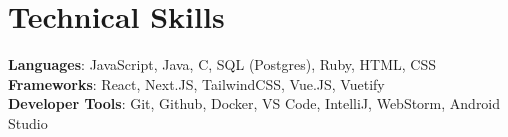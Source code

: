 \documentclass[letterpaper,11pt]{article}
\begin{document}
%
\section{Technical Skills}
 \begin{itemize}[leftmargin=0.15in, label={}]
    \small{\item{
     \textbf{Languages}{: JavaScript, Java, C, SQL (Postgres), Ruby, HTML, CSS} \\
     \textbf{Frameworks}{: React, Next.JS, TailwindCSS, Vue.JS, Vuetify} \\
     \textbf{Developer Tools}{: Git, Github, Docker, VS Code, IntelliJ, WebStorm, Android Studio}
    }}
 \end{itemize}


\end{document}
